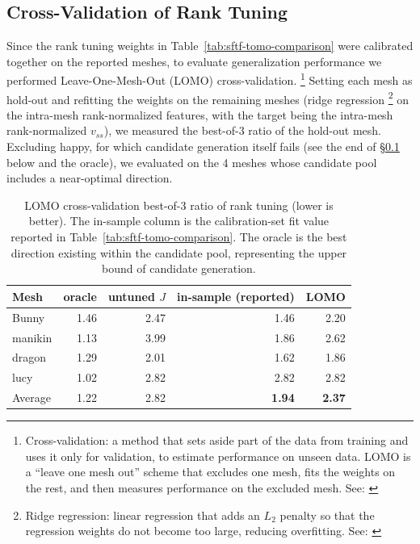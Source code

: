 \documentclass[11pt,a4paper]{article}
\begin{document}
\subsection{Cross-Validation of Rank Tuning}
\label{sec:cv}

Since the rank tuning weights in Table~\ref{tab:sftf-tomo-comparison} were calibrated together on the reported meshes,
to evaluate generalization performance we performed Leave-One-Mesh-Out (LOMO) cross-validation.%
\footnote{Cross-validation: a method that sets aside part of the data from training and uses it only for validation, to estimate performance
on unseen data. LOMO is a ``leave one mesh out'' scheme that excludes one mesh, fits the weights on the rest, and then measures performance
on the excluded mesh. See: \cite{stone1974}}
Setting each mesh as hold-out and refitting the weights on the remaining meshes
(ridge regression%
\footnote{Ridge regression: linear regression that adds an $L_2$ penalty so that the regression weights do not become too large,
reducing overfitting. See: \cite{hoerl1970}} on the intra-mesh rank-normalized features, with the target being the intra-mesh rank-normalized $v_{ss}$),
we measured the best-of-3 ratio of the hold-out mesh.
Excluding happy, for which candidate generation itself fails (see the end of \S\ref{sec:cv} below and the oracle),
we evaluated on the 4 meshes whose candidate pool includes a near-optimal direction.

\begin{table}[H]
\centering
\caption{LOMO cross-validation best-of-3 ratio of rank tuning (lower is better).
The in-sample column is the calibration-set fit value reported in Table~\ref{tab:sftf-tomo-comparison}.
The oracle is the best direction existing within the candidate pool, representing the upper bound of candidate generation.}
\label{tab:lomo-cv}
\begin{tabular}{lrrrr}
\toprule
Mesh & oracle & untuned $J$ & in-sample (reported) & LOMO\\
\midrule
Bunny    & 1.46 & 2.47 & 1.46 & 2.20\\
manikin  & 1.13 & 3.99 & 1.86 & 2.62\\
dragon   & 1.29 & 2.01 & 1.62 & 1.86\\
lucy     & 1.02 & 2.82 & 2.82 & 2.82\\
\midrule
Average     & 1.22 & 2.82 & \textbf{1.94} & \textbf{2.37}\\
\bottomrule
\end{tabular}
\end{table}
\end{document}
